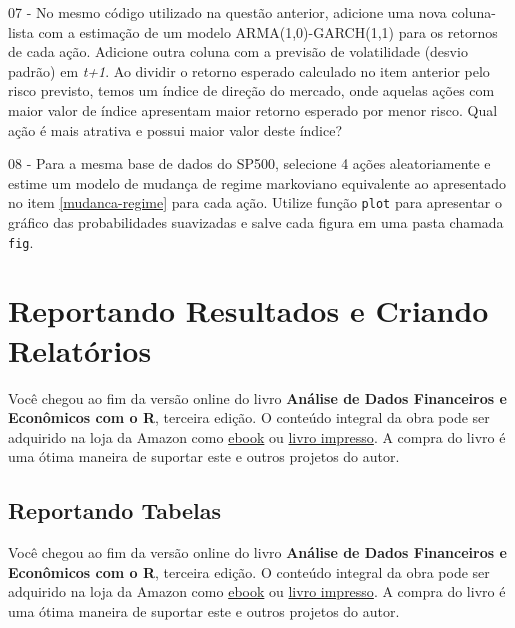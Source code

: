 \documentclass[
  11pt,
]{book}
\newenvironment{pleasebuyit}
{\begin{noteblock}
		
	} {\end{noteblock}}
\begin{document}
07 -
No mesmo código utilizado na questão anterior, adicione uma nova coluna-lista com a estimação de um modelo ARMA(1,0)-GARCH(1,1) para os retornos de cada ação. Adicione outra coluna com a previsão de volatilidade (desvio padrão) em \emph{t+1}. Ao dividir o retorno esperado calculado no item anterior pelo risco previsto, temos um índice de direção do mercado, onde aquelas ações com maior valor de índice apresentam maior retorno esperado por menor risco. Qual ação é mais atrativa e possui maior valor deste índice?

08 -
Para a mesma base de dados do SP500, selecione 4 ações aleatoriamente e estime um modelo de mudança de regime markoviano equivalente ao apresentado no item \ref{mudanca-regime} para cada ação. Utilize função \texttt{plot} para apresentar o gráfico das probabilidades suavizadas e salve cada figura em uma pasta chamada \texttt{\textquotesingle{}fig\textquotesingle{}}.

\hypertarget{reportando-resultados}{%
\chapter{Reportando Resultados e Criando Relatórios}\label{reportando-resultados}}

\begin{pleasebuyit}
Você chegou ao fim da versão online do livro \textbf{Análise de Dados
Financeiros e Econômicos com o R}, terceira edição. O conteúdo integral
da obra pode ser adquirido na loja da Amazon como
\href{https://www.amazon.com.br/dp/B08WNC27ZY}{ebook} ou
\href{https://www.amazon.com/dp/B08WP8CCDB}{livro impresso}. A compra do
livro é uma ótima maneira de suportar este e outros projetos do autor.
\end{pleasebuyit}

\hypertarget{reportando-tabelas}{%
\section{Reportando Tabelas}\label{reportando-tabelas}}

\begin{pleasebuyit}
Você chegou ao fim da versão online do livro \textbf{Análise de Dados
Financeiros e Econômicos com o R}, terceira edição. O conteúdo integral
da obra pode ser adquirido na loja da Amazon como
\href{https://www.amazon.com.br/dp/B08WNC27ZY}{ebook} ou
\href{https://www.amazon.com/dp/B08WP8CCDB}{livro impresso}. A compra do
livro é uma ótima maneira de suportar este e outros projetos do autor.
\end{pleasebuyit}
\end{document}
